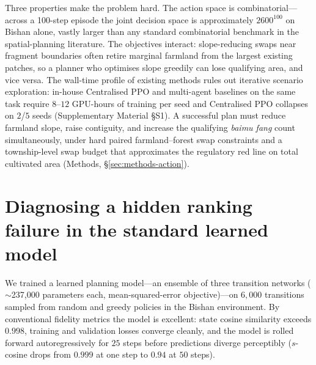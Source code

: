 \documentclass[11pt]{article}
\begin{document}
Three properties make the problem hard. The action space is combinatorial---across a 100-step episode the joint decision space is approximately $2600^{100}$ on Bishan alone, vastly larger than any standard combinatorial benchmark in the spatial-planning literature. The objectives interact: slope-reducing swaps near fragment boundaries often retire marginal farmland from the largest existing patches, so a planner who optimises slope greedily can lose qualifying area, and vice versa. The wall-time profile of existing methods rules out iterative scenario exploration: in-house Centralised PPO and multi-agent baselines on the same task require $8$--$12$ GPU-hours of training per seed and Centralised PPO collapses on $2$/$5$ seeds (Supplementary Material \S S1). A successful plan must reduce farmland slope, raise contiguity, and increase the qualifying \textit{baimu fang} count simultaneously, under hard paired farmland--forest swap constraints and a township-level swap budget that approximates the regulatory red line on total cultivated area (Methods, \S\ref{sec:methods-action}).

\section{Diagnosing a hidden ranking failure in the standard learned model}\label{sec:rank}

We trained a learned planning model---an ensemble of three transition networks ($\sim$237{,}000 parameters each, mean-squared-error objective)---on $6{,}000$ transitions sampled from random and greedy policies in the Bishan environment. By conventional fidelity metrics the model is excellent: state cosine similarity exceeds $0.998$, training and validation losses converge cleanly, and the model is rolled forward autoregressively for $25$ steps before predictions diverge perceptibly ($s$-cosine drops from $0.999$ at one step to $0.94$ at $50$ steps).
\end{document}
